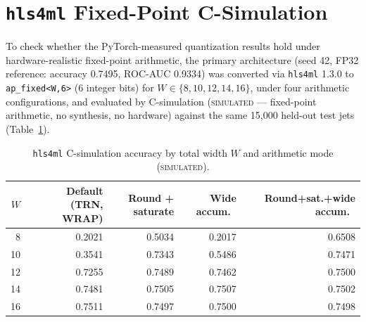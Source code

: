 \documentclass[11pt]{article}
\newcommand{\tiers}{\textsc{simulated}}
\begin{document}
\section{\texttt{hls4ml} Fixed-Point C-Simulation}
\label{sec:hls4ml}

To check whether the PyTorch-measured quantization results hold under hardware-realistic fixed-point
arithmetic, the primary architecture (seed 42, FP32 reference: accuracy 0.7495, ROC-AUC 0.9334) was
converted via \texttt{hls4ml} 1.3.0 to \texttt{ap\_fixed<W,6>} (6 integer bits) for
$W \in \{8,10,12,14,16\}$, under four arithmetic configurations, and evaluated by C-simulation
(\tiers{} --- fixed-point arithmetic, no synthesis, no hardware) against the same 15{,}000 held-out
test jets (Table~\ref{tab:hls}).

\begin{table}[h]
\centering
\caption{\texttt{hls4ml} C-simulation accuracy by total width $W$ and arithmetic mode (\tiers{}).}
\label{tab:hls}
\footnotesize
\begin{tabular}{rrrrr}
\toprule
$W$ & Default (TRN, WRAP) & Round + saturate & Wide accum.\ & Round+sat.+wide accum.\ \\
\midrule
8  & 0.2021 & 0.5034 & 0.2017 & 0.6508 \\
10 & 0.3541 & 0.7343 & 0.5486 & 0.7471 \\
12 & 0.7255 & 0.7489 & 0.7462 & 0.7500 \\
14 & 0.7481 & 0.7505 & 0.7507 & 0.7502 \\
16 & 0.7511 & 0.7497 & 0.7500 & 0.7498 \\
\bottomrule
\end{tabular}
\end{table}
\end{document}
